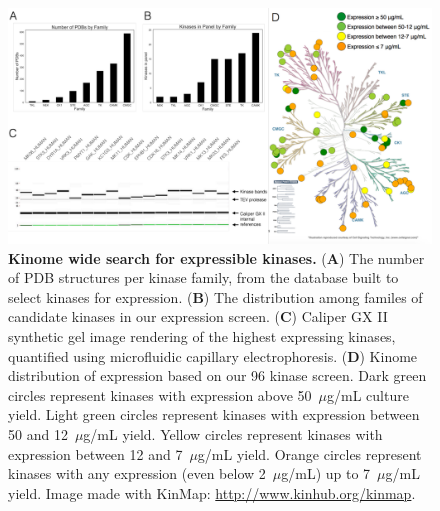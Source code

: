 \documentclass[phd,tocprelim]{cornell}
\begin{document}
\begin{landscape}
	\begin{figure}[p]
		\centering
 \includegraphics[width=\linewidth]{figures/96-kinase-figure}
\caption[Kinome wide search for expressible kinases.]{{\bf Kinome wide search for expressible kinases.}
	({\bf A}) The number of PDB structures per kinase family, from the database built to select kinases for expression. ({\bf B}) The distribution among familes of candidate kinases in our expression screen. ({\bf C}) Caliper GX II synthetic gel image rendering of the highest expressing kinases, quantified using microfluidic capillary electrophoresis.  ({\bf D}) Kinome distribution of expression based on our 96 kinase screen. Dark green circles represent kinases with expression above 50~$\mu$g/mL culture yield.
	Light green circles represent kinases with expression between 50 and 12~$\mu$g/mL yield.
	Yellow circles represent kinases with expression between 12 and 7~$\mu$g/mL yield.
	Orange circles represent kinases with any expression (even below 2~$\mu$g/mL) up to 7~$\mu$g/mL yield.
	Image made with KinMap: \href{http://www.kinhub.org/kinmap}{http://www.kinhub.org/kinmap}. 
}
\label{fig:kinome-expression}
\end{figure}
\end{landscape}
\end{document}
